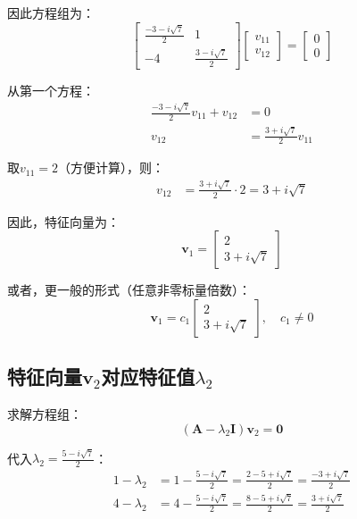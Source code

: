 \documentclass[12pt,a4paper]{article}
\begin{document}
因此方程组为：
\begin{equation}
\begin{bmatrix} \frac{-3 - i\sqrt{7}}{2} & 1 \\ -4 & \frac{3 - i\sqrt{7}}{2} \end{bmatrix} \begin{bmatrix} v_{11} \\ v_{12} \end{bmatrix} = \begin{bmatrix} 0 \\ 0 \end{bmatrix}
\end{equation}

从第一个方程：
\begin{align}
\frac{-3 - i\sqrt{7}}{2} v_{11} + v_{12} &= 0 \\
v_{12} &= \frac{3 + i\sqrt{7}}{2} v_{11}
\end{align}

取$v_{11} = 2$（方便计算），则：
\begin{align}
v_{12} &= \frac{3 + i\sqrt{7}}{2} \cdot 2 = 3 + i\sqrt{7}
\end{align}

因此，特征向量为：
\begin{equation}
\bm{v}_1 = \begin{bmatrix} 2 \\ 3 + i\sqrt{7} \end{bmatrix}
\end{equation}

或者，更一般的形式（任意非零标量倍数）：
\begin{equation}
\bm{v}_1 = c_1 \begin{bmatrix} 2 \\ 3 + i\sqrt{7} \end{bmatrix}, \quad c_1 \neq 0
\end{equation}

\subsection{特征向量$\bm{v}_2$对应特征值$\lambda_2$}

求解方程组：
\begin{equation}
(\bm{A} - \lambda_2 \bm{I})\bm{v}_2 = \bm{0}
\end{equation}

代入$\lambda_2 = \frac{5 - i\sqrt{7}}{2}$：
\begin{align}
1 - \lambda_2 &= 1 - \frac{5 - i\sqrt{7}}{2} = \frac{2 - 5 + i\sqrt{7}}{2} = \frac{-3 + i\sqrt{7}}{2} \\
4 - \lambda_2 &= 4 - \frac{5 - i\sqrt{7}}{2} = \frac{8 - 5 + i\sqrt{7}}{2} = \frac{3 + i\sqrt{7}}{2}
\end{align}
\end{document}
